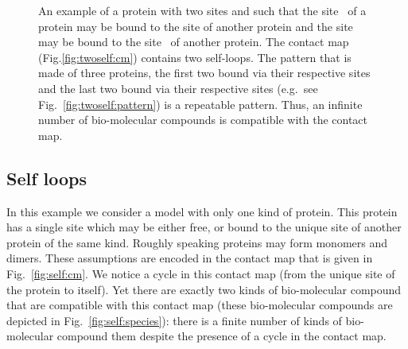 \documentclass{entcs}
\begin{document}
\begin{figure}
\caption{An example of a protein with two sites  and  such that the site {}\;\; of a protein may be bound to the site  of another protein and the site  may be bound to the site \;\; of another protein.
The contact map (Fig.\ref{fig:twoself:cm}) contains two self-loops.
The pattern that is made of three proteins, the first two bound via their respective sites  and the last two bound via their respective sites  (e.g.~see Fig.~\ref{fig:twoself:pattern}) is a repeatable pattern. Thus, an infinite number of bio-molecular compounds is compatible with the contact map.  }
\end{figure}

\subsection{Self loops}
\label{sec:self-loop}
In this example we consider a model with only one kind of protein. This protein has a single site which may be either free, or bound to the unique site of another protein of the same kind. Roughly speaking proteins may form monomers  and dimers. These assumptions are encoded in the contact map that is given in Fig.~\ref{fig:self:cm}. We notice a cycle in this contact map (from the unique site of the protein to itself). Yet
there are exactly two kinds of bio-molecular compound that are
compatible with this contact map (these bio-molecular compounds are depicted in Fig.~\ref{fig:self:species}):  there is a finite number of kinds of bio-molecular compound them despite the presence of a cycle in the contact map.
\end{document}
